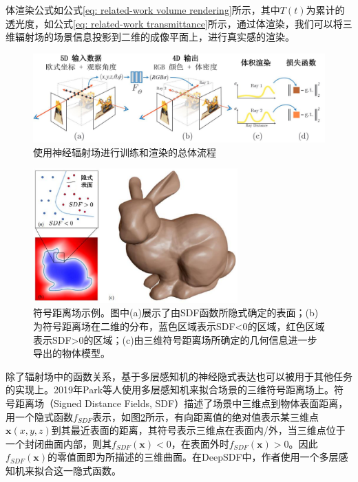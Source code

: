 体渲染公式如公式\ref{eq: related-work volume rendering}所示，其中$T(t)$为累计的透光度，如公式\ref{eq: related-work transmittance}所示，通过体渲染，我们可以将三维辐射场的场景信息投影到二维的成像平面上，进行真实感的渲染。


\begin{figure}[t]
    \centering
    \includegraphics[width=\textwidth]{undergraduate-thesis/images/related-work/NeRF method.pdf}
    \caption{使用神经辐射场进行训练和渲染的总体流程}
    \label{fig:related-work NeRF pipeline}
\end{figure}

\begin{figure}[ht]
    \centering
    \includegraphics[width=0.7\textwidth]{undergraduate-thesis/images/related-work/SDF concept.pdf}
    \caption{符号距离场示例。图中(a)展示了由SDF函数所隐式确定的表面；(b)为符号距离场在二维的分布，蓝色区域表示SDF<0的区域，红色区域表示SDF>0的区域；(c)由三维符号距离场所确定的几何信息进一步导出的物体模型。}
    \label{fig:related-work SDF concept}
\end{figure}

除了辐射场中的函数关系，基于多层感知机的神经隐式表达也可以被用于其他任务的实现上\cite{park_deepsdf_2019, mescheder_occupancy_2019, shim_snerl_2023, zhi_-place_2021}。2019年Park等人使用多层感知机来拟合场景的三维符号距离场上。符号距离场（Signed Distance Fields, SDF）描述了场景中三维点到物体表面距离，用一个隐式函数$f_{SDF}$表示，如图\ref{fig:related-work SDF concept}所示，有向距离值的绝对值表示某三维点$\mathbf{x}(x,y,z)$到其最近表面的距离，其符号表示三维点在表面内/外，当三维点位于一个封闭曲面内部，则其$f_{SDF}(\mathbf{x}) < 0$，在表面外时$f_{SDF}(\mathbf{x}) > 0$。因此$f_{SDF}(\mathbf{x})$的零值面即为所描述的三维曲面。在DeepSDF中，作者使用一个多层感知机来拟合这一隐式函数。

